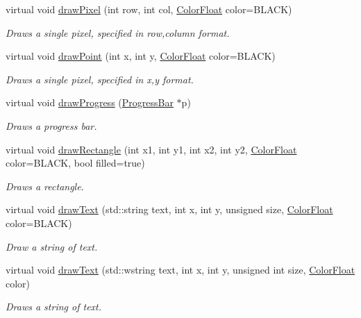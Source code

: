 \begin{DoxyCompactItemize}
virtual void \hyperlink{classtsgl_1_1_canvas_af17d456eca4ad5a55842f2cf02f48a97}{draw\+Pixel} (int row, int col, \hyperlink{structtsgl_1_1_color_float}{Color\+Float} color=B\+L\+A\+C\+K)
\begin{DoxyCompactList}\small\item\em Draws a single pixel, specified in row,column format. \end{DoxyCompactList}\item 
virtual void \hyperlink{classtsgl_1_1_canvas_a6c17c90cd13f7b0184a25e4acc2b7426}{draw\+Point} (int x, int y, \hyperlink{structtsgl_1_1_color_float}{Color\+Float} color=B\+L\+A\+C\+K)
\begin{DoxyCompactList}\small\item\em Draws a single pixel, specified in x,y format. \end{DoxyCompactList}\item 
virtual void \hyperlink{classtsgl_1_1_canvas_aea792059486ebe6d25d7f81bdadf751d}{draw\+Progress} (\hyperlink{classtsgl_1_1_progress_bar}{Progress\+Bar} $\ast$p)
\begin{DoxyCompactList}\small\item\em Draws a progress bar. \end{DoxyCompactList}\item 
virtual void \hyperlink{classtsgl_1_1_canvas_a752754cd16d14447cb5e5b0438bebf16}{draw\+Rectangle} (int x1, int y1, int x2, int y2, \hyperlink{structtsgl_1_1_color_float}{Color\+Float} color=B\+L\+A\+C\+K, bool filled=true)
\begin{DoxyCompactList}\small\item\em Draws a rectangle. \end{DoxyCompactList}\item 
virtual void \hyperlink{classtsgl_1_1_canvas_a3457e7ebd17fa5003025ff6bcaaeedf6}{draw\+Text} (std\+::string text, int x, int y, unsigned size, \hyperlink{structtsgl_1_1_color_float}{Color\+Float} color=B\+L\+A\+C\+K)
\begin{DoxyCompactList}\small\item\em Draw a string of text. \end{DoxyCompactList}\item 
virtual void \hyperlink{classtsgl_1_1_canvas_a1873adb0f3f43e3ebec33fdaf6c6a3d5}{draw\+Text} (std\+::wstring text, int x, int y, unsigned int size, \hyperlink{structtsgl_1_1_color_float}{Color\+Float} color)
\begin{DoxyCompactList}\small\item\em Draws a string of text. \end{DoxyCompactList}\item 

\end{DoxyCompactItemize}

